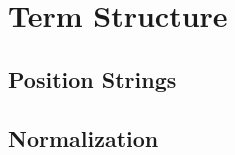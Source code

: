 
\section{Term Structure}

\subsection{Position Strings}
\begin{frame}
	
\end{frame}

\subsection{Normalization}
\begin{frame}
	
	
\end{frame}
